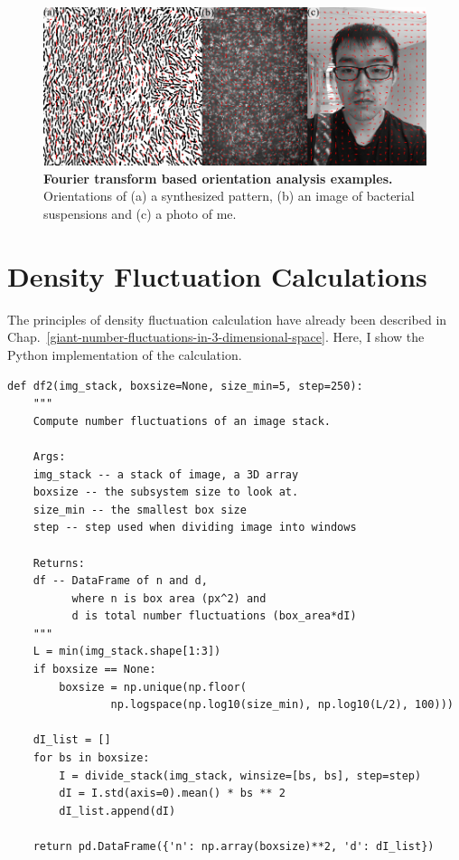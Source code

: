 \begin{figure}[h]
	\begin{center}
	\includegraphics[width=5.5in]{Figs/A-2/oft-gallery.pdf}
	\end{center}
	\caption[Fourier Transform Based Orientation Analysis Examples]
	{
	\textbf{Fourier transform based orientation analysis examples.}
  Orientations of
  (a) a synthesized pattern,
  (b) an image of bacterial suspensions and
  (c) a photo of me.
	}
	\label{fig:oft-gallery}
\end{figure}

\section{Density Fluctuation Calculations}
\label{sec:A-df-calculation}
The principles of density fluctuation calculation have already been described in Chap.~\ref{giant-number-fluctuations-in-3-dimensional-space}. Here, I show the Python implementation of the calculation.

\begin{verbatim}
def df2(img_stack, boxsize=None, size_min=5, step=250):
    """
    Compute number fluctuations of an image stack.

    Args:
    img_stack -- a stack of image, a 3D array
    boxsize -- the subsystem size to look at.
    size_min -- the smallest box size
    step -- step used when dividing image into windows

    Returns:
    df -- DataFrame of n and d,
          where n is box area (px^2) and
          d is total number fluctuations (box_area*dI)
    """
    L = min(img_stack.shape[1:3])
    if boxsize == None:
        boxsize = np.unique(np.floor(
                np.logspace(np.log10(size_min), np.log10(L/2), 100)))

    dI_list = []
    for bs in boxsize:
        I = divide_stack(img_stack, winsize=[bs, bs], step=step)
        dI = I.std(axis=0).mean() * bs ** 2
        dI_list.append(dI)

    return pd.DataFrame({'n': np.array(boxsize)**2, 'd': dI_list})
\end{verbatim}
